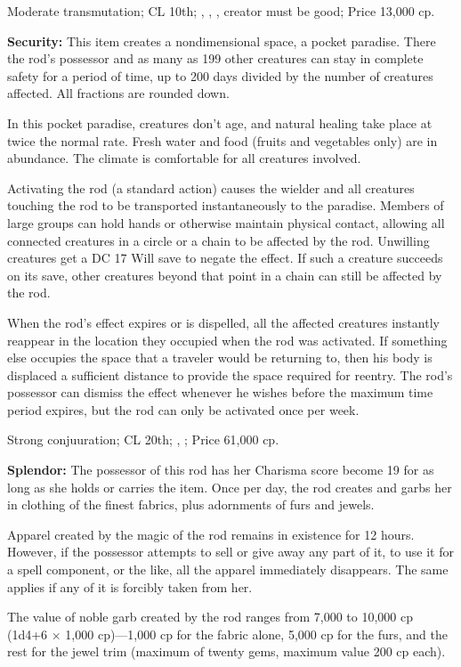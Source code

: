Moderate transmutation; CL 10th; , , , creator must be good; Price 13,000 cp.

\textbf{Security:} This item creates a nondimensional space, a pocket paradise. There the rod's possessor and as many as 199 other creatures can stay in complete safety for a period of time, up to 200 days divided by the number of creatures affected. All fractions are rounded down.

In this pocket paradise, creatures don't age, and natural healing take place at twice the normal rate. Fresh water and food (fruits and vegetables only) are in abundance. The climate is comfortable for all creatures involved.

Activating the rod (a standard action) causes the wielder and all creatures touching the rod to be transported instantaneously to the paradise. Members of large groups can hold hands or otherwise maintain physical contact, allowing all connected creatures in a circle or a chain to be affected by the rod. Unwilling creatures get a DC 17 Will save to negate the effect. If such a creature succeeds on its save, other creatures beyond that point in a chain can still be affected by the rod.

When the rod's effect expires or is dispelled, all the affected creatures instantly reappear in the location they occupied when the rod was activated. If something else occupies the space that a traveler would be returning to, then his body is displaced a sufficient distance to provide the space required for reentry. The rod's possessor can dismiss the effect whenever he wishes before the maximum time period expires, but the rod can only be activated once per week.

Strong conjuuration; CL 20th; , ; Price 61,000 cp.

\textbf{Splendor:} The possessor of this rod has her Charisma score become 19 for as long as she holds or carries the item. Once per day, the rod creates and garbs her in clothing of the finest fabrics, plus adornments of furs and jewels.

Apparel created by the magic of the rod remains in existence for 12 hours. However, if the possessor attempts to sell or give away any part of it, to use it for a spell component, or the like, all the apparel immediately disappears. The same applies if any of it is forcibly taken from her.

The value of noble garb created by the rod ranges from 7,000 to 10,000 cp (1d4+6 $\times$ 1,000 cp)---1,000 cp for the fabric alone, 5,000 cp for the furs, and the rest for the jewel trim (maximum of twenty gems, maximum value 200 cp each).

